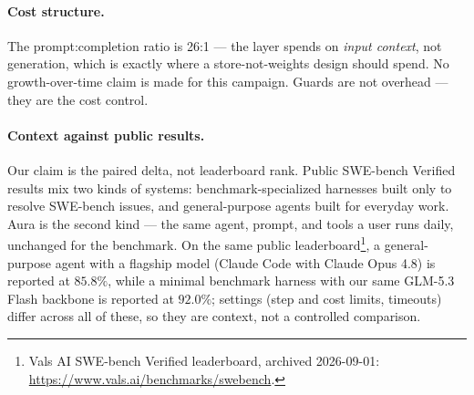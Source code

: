 \documentclass[11pt]{article}
\begin{document}
\begin{table}[htbp]
\centering
\small
\caption{Token economics of the 1{,}000-run A/B. Receipts capture final-state totals; per-call event sums capture gross re-send billing (no KV cache on the endpoint: all calls bill cold).}
\label{tab:tokens}
\end{table}

\paragraph{Cost structure.} The prompt:completion ratio is 26:1 --- the layer spends on \emph{input context}, not generation, which is exactly where a store-not-weights design should spend. No growth-over-time claim is made for this campaign. Guards are not overhead --- they are the cost control.

\paragraph{Context against public results.} Our claim is the paired delta, not leaderboard rank. Public SWE-bench Verified results mix two kinds of systems: benchmark-specialized harnesses built only to resolve SWE-bench issues, and general-purpose agents built for everyday work. Aura is the second kind --- the same agent, prompt, and tools a user runs daily, unchanged for the benchmark. On the same public leaderboard\footnote{Vals AI SWE-bench Verified leaderboard, archived 2026-09-01: \url{https://www.vals.ai/benchmarks/swebench}.}, a general-purpose agent with a flagship model (Claude Code with Claude Opus 4.8) is reported at $85.8\%$, while a minimal benchmark harness with our same GLM-5.3 Flash backbone is reported at $92.0\%$; settings (step and cost limits, timeouts) differ across all of these, so they are context, not a controlled comparison.
\end{document}
